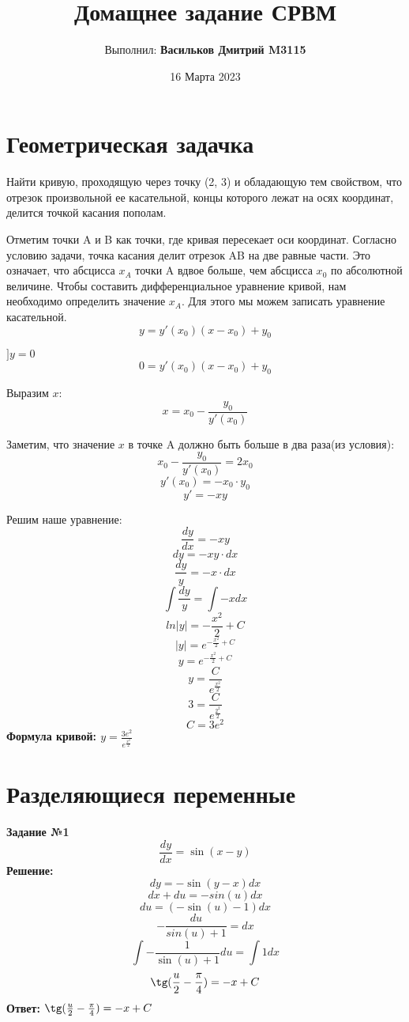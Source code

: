 \documentclass{article}
\title{Домащнее задание СРВМ}
\author{Выполнил: \textbf{Васильков Дмитрий M3115}}
\date{16 Марта 2023}
\begin{document}
\maketitle

\section{Геометрическая задачка}
\par{Найти кривую, проходящую через точку (2, 3) и обладающую тем свойством, что отрезок произвольной ее касательной, концы которого лежат на осях координат, делится точкой касания пополам.}\\

\par{Отметим точки A и B как точки, где кривая пересекает оси координат. Согласно условию задачи, точка касания делит отрезок AB на две равные части. Это означает, что абсцисса $x_{A}$ точки A вдвое больше, чем абсцисса $x_{0}$ по абсолютной величине. Чтобы составить дифференциальное уравнение кривой, нам необходимо определить значение $x_{A}$. Для этого мы можем записать уравнение касательной.}
$$y = y'(x_{0})(x-x_{0})+y_{0}$$
\par{$]y=0$}
$$0 = y'(x_{0})(x-x_{0})+y_{0}$$
\par{Выразим $x$:}
$$x=x_{0} - \frac{y_{0}}{y'(x_{0})}$$
\par{Заметим, что значение $x$ в точке A должно быть больше в два раза(из условия):}
$$x_{0} - \frac{y_{0}}{y'(x_{0})} = 2x_{0}$$
$$y'(x_{0}) = -x_{0} \cdot y_{0}$$
$$y' = -xy$$
\par{Решим наше уравнение:}
$$\frac{dy}{dx} = -xy$$
$$dy = -xy \cdot dx$$
$$\frac{dy}{y} = -x \cdot dx$$
$$\int{\frac{dy}{y}} = \int{-xdx}$$
$$ln|y| = -\frac{x^2}{2} + C$$
$$|y| = e^{-\frac{x^2}{2} + C}$$
$$y = e^{-\frac{x^2}{2} + C}$$
$$y = \frac{C}{e^{\frac{x^2}{2}}}$$
$$3 = \frac{C}{e^{\frac{2^2}{2}}}$$
$$C = 3e^2$$
\textbf{Формула кривой: $y = \frac{3e^2}{e^{\frac{x^2}{2}}}$}

\section{Разделяющиеся переменные}

\textbf{Задание №1}
$$\frac{dy}{dx} = \sin(x-y)$$
\textbf{Решение:}
$$dy = -\sin(y - x)dx$$
$$dx + du = -sin(u)dx$$
$$du = (-\sin(u) - 1)dx$$
$$-\frac{du}{sin(u) + 1} = dx$$
$$\int-\frac{1}{\sin(u)+1}du = \int1dx$$
$$\tg({\frac{u}{2} - \frac{\pi}{4}}) = -x + C$$
\textbf{Ответ: $\tg({\frac{u}{2} - \frac{\pi}{4}}) = -x + C$}\\\\
\end{document}
